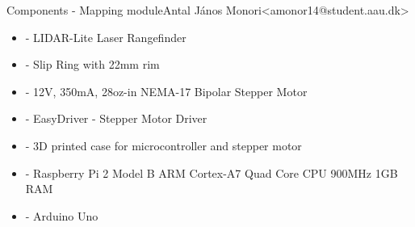 \begin{frame}{Components - Mapping module}{Antal János Monori\newline<amonor14@student.aau.dk>}
	\begin{itemize}
		\item - LIDAR-Lite Laser Rangefinder
		\item - Slip Ring with 22mm rim
		\item - 12V, 350mA, 28oz-in NEMA-17 Bipolar Stepper Motor
		\item - EasyDriver - Stepper Motor Driver
		\item - 3D printed case for microcontroller and stepper motor
		\item - Raspberry Pi 2 Model B ARM Cortex-A7 Quad Core CPU 900MHz 1GB RAM 
		\item - Arduino Uno
	\end{itemize}
\end{frame}